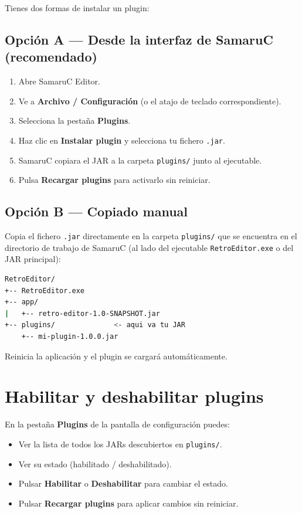 \documentclass[../../main.tex]{subfiles}
\begin{document}
Tienes dos formas de instalar un plugin:

\subsection{Opción A — Desde la interfaz de SamaruC (recomendado)}

\begin{enumerate}
\item Abre SamaruC Editor.
\item Ve a \textbf{Archivo / Configuración} (o el atajo de teclado correspondiente).
\item Selecciona la pesta\~na \textbf{Plugins}.
\item Haz clic en \textbf{Instalar plugin} y selecciona tu fichero \lstinline|.jar|.
\item SamaruC copiara el JAR a la carpeta \lstinline|plugins/| junto al ejecutable.
\item Pulsa \textbf{Recargar plugins} para activarlo sin reiniciar.
\end{enumerate}

\clearpage

\subsection{Opción B — Copiado manual}

Copia el fichero \lstinline|.jar| directamente en la carpeta \lstinline|plugins/| que se encuentra en el directorio de trabajo de SamaruC (al lado del ejecutable \lstinline|RetroEditor.exe| o del JAR principal):

\begin{lstlisting}[language=bash]
RetroEditor/
+-- RetroEditor.exe
+-- app/
|   +-- retro-editor-1.0-SNAPSHOT.jar
+-- plugins/              <- aqui va tu JAR
    +-- mi-plugin-1.0.0.jar
\end{lstlisting}

Reinicia la aplicación y el plugin se cargará automáticamente.

\section{Habilitar y deshabilitar plugins}

En la pestaña \textbf{Plugins} de la pantalla de configuración puedes:

\begin{itemize}
    \item Ver la lista de todos los JARs descubiertos en \lstinline|plugins/|.
    \item Ver su estado (habilitado / deshabilitado).
    \item Pulsar \textbf{Habilitar} o \textbf{Deshabilitar} para cambiar el estado.
    \item Pulsar \textbf{Recargar plugins} para aplicar cambios sin reiniciar.
\end{itemize}
\end{document}
